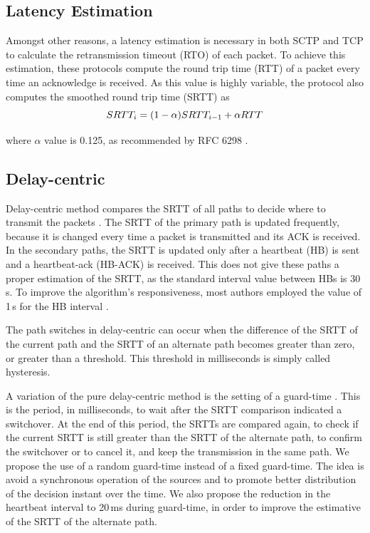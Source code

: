 \documentclass[letterpaper,10pt,oneside,conference,final]{sbrt2015}
\begin{document}
  \subsection{Latency Estimation}

  Amongst other reasons, a latency estimation is necessary in both SCTP and TCP to calculate the retransmission timeout (RTO) of each packet. To achieve this estimation, these protocols compute the round trip time (RTT) of a packet every time an acknowledge is received. As this value is highly variable, the protocol also computes the smoothed round trip time (SRTT) as 
  \begin{equation}
   SRTT_i  = (1 - \alpha) SRTT_{i-1} + \alpha  RTT \\
  \end{equation}

  where $\alpha$ value is 0.125, as recommended by RFC 6298 \cite{Paxson2011a}.


  \subsection{Delay-centric}

  Delay-centric method compares the SRTT of all paths to decide where to transmit the packets \cite{Kelly2004}. The SRTT of the primary path is updated frequently, because it is changed every time a packet is transmitted and its ACK is received. In the secondary paths, the SRTT is updated only after a heartbeat (HB) is sent and a heartbeat-ack (HB-ACK) is received. This does not give these paths a proper estimation of the SRTT, as the standard interval value between HBs is 30\,s. To improve the algorithm's responsiveness, most authors employed the value of 1\,s for the HB interval \cite{Noonan2004b}\cite{Gavriloff2009}\cite{Torres2014}.

The path switches in delay-centric can occur when the difference of the SRTT of the current path and the SRTT of an alternate path becomes greater than zero, or greater than a threshold. This threshold in milliseconds is simply called hysteresis.

A variation of the pure delay-centric method is the setting of a guard-time \cite{Gavriloff2009a}. This is the period, in milliseconds, to wait after the SRTT comparison indicated a switchover. At the end of this period, the SRTTs are compared again, to check if the current SRTT is still greater than the SRTT of the alternate path, to confirm the switchover or to cancel it, and keep the transmission in the same path. We propose the use of a random guard-time instead of a fixed guard-time. The idea is avoid a synchronous operation of the sources and to promote better distribution of the decision instant over the time. We also propose the reduction in the heartbeat interval to 20\,ms during guard-time, in order to improve the estimative of the SRTT of the alternate path.
\end{document}
